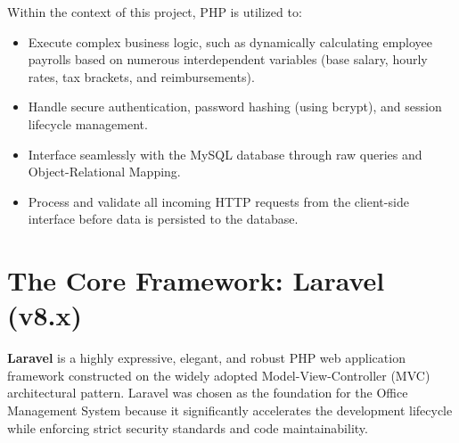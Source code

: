 ﻿\documentclass[12pt,a4paper]{report}
\begin{document}
Within the context of this project, PHP is utilized to:
\begin{itemize}
    \item Execute complex business logic, such as dynamically calculating employee payrolls based on numerous interdependent variables (base salary, hourly rates, tax brackets, and reimbursements).
    \item Handle secure authentication, password hashing (using bcrypt), and session lifecycle management.
    \item Interface seamlessly with the MySQL database through raw queries and Object-Relational Mapping.
    \item Process and validate all incoming HTTP requests from the client-side interface before data is persisted to the database.
\end{itemize}

\section*{The Core Framework: Laravel (v8.x)}
\textbf{Laravel} is a highly expressive, elegant, and robust PHP web application framework constructed on the widely adopted Model-View-Controller (MVC) architectural pattern. Laravel was chosen as the foundation for the Office Management System because it significantly accelerates the development lifecycle while enforcing strict security standards and code maintainability.
\end{document}
